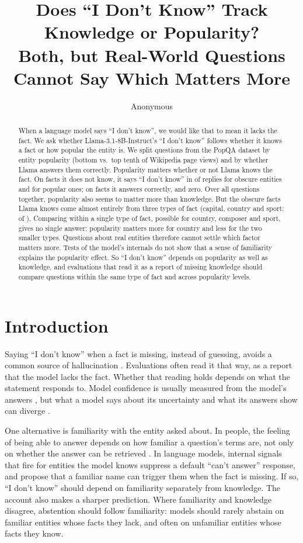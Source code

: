 \documentclass[11pt]{article}
\title{Does ``I Don't Know'' Track Knowledge or Popularity?\\Both, but Real-World Questions Cannot Say Which Matters More}
\author{Anonymous}
\newcommand{\idk}{``I don't know''}
\begin{document}
\maketitle

\begin{abstract}
When a language model says \idk, we would like that to mean it lacks the fact. We ask whether Llama-3.1-8B-Instruct's \idk{} follows whether it knows a fact or how popular the entity is. We split questions from the PopQA dataset by entity popularity (bottom vs.\ top tenth of Wikipedia page views) and by whether Llama answers them correctly. Popularity matters whether or not Llama knows the fact. On facts it does not know, it says \idk{} in \tcObsUnkAbs{} of replies for obscure entities and \tcPopUnkAbs{} for popular ones; on facts it answers correctly, \tcObsKnownAbs{} and zero. Over all questions together, popularity also seems to matter more than knowledge. But the obscure facts Llama knows come almost entirely from three types of fact (capital, country and sport: \rcTopThree{} of \gsObsKnownTotal). Comparing within a single type of fact, possible for country, composer and sport, gives no single answer: popularity matters more for country and less for the two smaller types. Questions about real entities therefore cannot settle which factor matters more. Tests of the model's internals do not show that a sense of familiarity explains the popularity effect. So \idk{} depends on popularity as well as knowledge, and evaluations that read it as a report of missing knowledge should compare questions within the same type of fact and across popularity levels.
\end{abstract}

\section{Introduction}

Saying \idk{} when a fact is missing, instead of guessing, avoids a common source of hallucination \citep{kalai2025hallucinate}. Evaluations often read it that way, as a report that the model lacks the fact. Whether that reading holds depends on what the statement responds to. Model confidence is usually measured from the model's answers \citep{kadavath2022know,kuhn2023semantic}, but what a model says about its uncertainty and what its answers show can diverge \citep{ji2025hedging}.

One alternative is familiarity with the entity asked about. In people, the feeling of being able to answer depends on how familiar a question's terms are, not only on whether the answer can be retrieved \citep{reder1992,koriat2001cascade}. In language models, internal signals that fire for entities the model knows suppress a default ``can't answer'' response, and \citet{lindsey2025biology} propose that a familiar name can trigger them when the fact is missing. If so, \idk{} should depend on familiarity separately from knowledge. The account also makes a sharper prediction. Where familiarity and knowledge disagree, abstention should follow familiarity: models should rarely abstain on familiar entities whose facts they lack, and often on unfamiliar entities whose facts they know.
\end{document}
